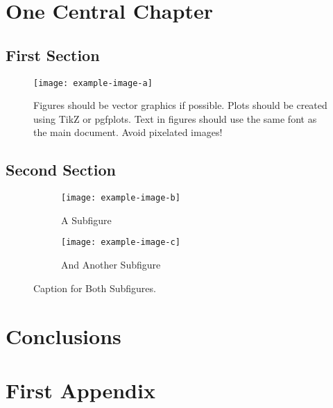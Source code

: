 \documentclass[english,algorithms,reviews,examples,MA]{amsthesis}
\begin{document}
    \chapter{One Central Chapter}
    \lipsum[11]

    \section{First Section}
    \lipsum[11]
    \begin{figure}[h]
        \texttt{[image: example-image-a]}
        \caption[A short description for the List of Figures.]{Figures should be vector graphics if possible. Plots should be created using TikZ or pgfplots. Text in figures should use the same font as the main document. Avoid pixelated images!}
    \end{figure}

    \lipsum[11-13]

    \section{Second Section}
    \lipsum[11]
    \begin{figure}
        \begin{subfigure}{0.5\textwidth}
            \centering
            \texttt{[image: example-image-b]}
            \caption{A Subfigure}
        \end{subfigure}
        \begin{subfigure}{0.5\textwidth}
            \centering
            \texttt{[image: example-image-c]}
            \caption{And Another Subfigure}
        \end{subfigure}
        \caption{Caption for Both Subfigures.}        
    \end{figure}
    \lipsum[11]   

    \chapter{Conclusions}
    \lipsum[95-99]    


    \appendix

    \chapter{First Appendix}
    \lipsum[1]
\end{document}
